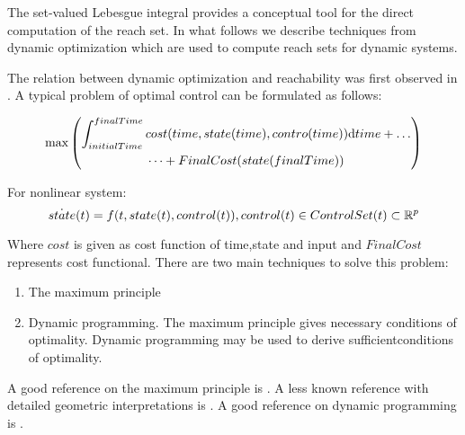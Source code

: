     The set-valued Lebesgue integral provides a conceptual tool for the direct computation of the reach set. In what follows we describe techniques from dynamic optimization which are used to compute reach sets for dynamic systems.

    The relation between dynamic optimization and reachability was first observed in \cite{leitmann1982optimality}. A typical problem of optimal control can be formulated as follows:

    \begin{equation}
        \max \left(
        \begin{gathered}
            \int_{initialTime}^{finalTime} cost(time,state(time),contro(time)) \textnormal{d}time + \dots \\ \dots +FinalCost(state(finalTime))\end{gathered}
        \right)
    \end{equation}
    
    \noindent For nonlinear system:
    \begin{equation}
        \dot{state}(t) = f(t,state(t),control(t)), control(t) \in ControlSet(t) \subset \R^p
    \end{equation}
    
    Where $cost$ is given as cost function of time,state and input and $FinalCost$ represents cost functional.
    There are two main techniques to solve this problem: 
    
    \begin{enumerate}
        \item The maximum principle
        
        \item Dynamic programming. The maximum principle gives necessary conditions of optimality. Dynamic programming may be used to derive sufficientconditions of optimality.
    \end{enumerate}

    A good reference on the maximum principle is \cite{pontryagin1962ef}. A less known reference with detailed geometric interpretations is \cite{girsanov2012lectures}. A good reference on dynamic programming is \cite{bardi2008optimal}.
    
